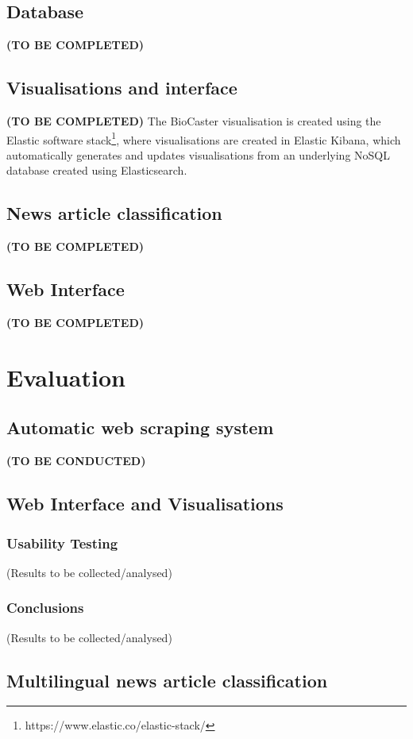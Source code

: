 \documentclass{l4proj}
\begin{document}
\section{Database}
\textbf{(TO BE COMPLETED)}
\section{Visualisations and interface}
\textbf{(TO BE COMPLETED)}
The BioCaster visualisation is created using the Elastic software stack\footnote{https://www.elastic.co/elastic-stack/}, where visualisations are created in Elastic Kibana, which automatically generates and updates visualisations from an underlying NoSQL database created using Elasticsearch.
\section{News article classification}
\textbf{(TO BE COMPLETED)}
\section{Web Interface}
\textbf{(TO BE COMPLETED)}
\chapter{Evaluation}

\section{Automatic web scraping system}
\textbf{(TO BE CONDUCTED)}
\section{Web Interface and Visualisations}
\subsection{Usability Testing}
(Results to be collected/analysed)
\subsection{Conclusions}
(Results to be collected/analysed)
\section{Multilingual news article classification}
\end{document}
